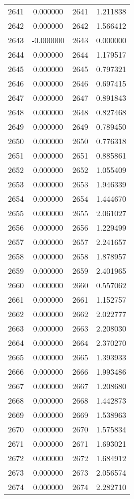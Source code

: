 \documentclass[12pt]{article}
\begin{document}
\begin{longtable}{@{}cccc@{}}
2641 & 0.000000 & 2641 & 1.211838 \\
2642 & 0.000000 & 2642 & 1.566412 \\
2643 & -0.000000 & 2643 & 0.000000 \\
2644 & 0.000000 & 2644 & 1.179517 \\
2645 & 0.000000 & 2645 & 0.797321 \\
2646 & 0.000000 & 2646 & 0.697415 \\
2647 & 0.000000 & 2647 & 0.891843 \\
2648 & 0.000000 & 2648 & 0.827468 \\
2649 & 0.000000 & 2649 & 0.789450 \\
2650 & 0.000000 & 2650 & 0.776318 \\
2651 & 0.000000 & 2651 & 0.885861 \\
2652 & 0.000000 & 2652 & 1.055409 \\
2653 & 0.000000 & 2653 & 1.946339 \\
2654 & 0.000000 & 2654 & 1.444670 \\
2655 & 0.000000 & 2655 & 2.061027 \\
2656 & 0.000000 & 2656 & 1.229499 \\
2657 & 0.000000 & 2657 & 2.241657 \\
2658 & 0.000000 & 2658 & 1.878957 \\
2659 & 0.000000 & 2659 & 2.401965 \\
2660 & 0.000000 & 2660 & 0.557062 \\
2661 & 0.000000 & 2661 & 1.152757 \\
2662 & 0.000000 & 2662 & 2.022777 \\
2663 & 0.000000 & 2663 & 2.208030 \\
2664 & 0.000000 & 2664 & 2.370270 \\
2665 & 0.000000 & 2665 & 1.393933 \\
2666 & 0.000000 & 2666 & 1.993486 \\
2667 & 0.000000 & 2667 & 1.208680 \\
2668 & 0.000000 & 2668 & 1.442873 \\
2669 & 0.000000 & 2669 & 1.538963 \\
2670 & 0.000000 & 2670 & 1.575834 \\
2671 & 0.000000 & 2671 & 1.693021 \\
2672 & 0.000000 & 2672 & 1.684912 \\
2673 & 0.000000 & 2673 & 2.056574 \\
2674 & 0.000000 & 2674 & 2.282710 \\

\end{longtable}
\end{document}

